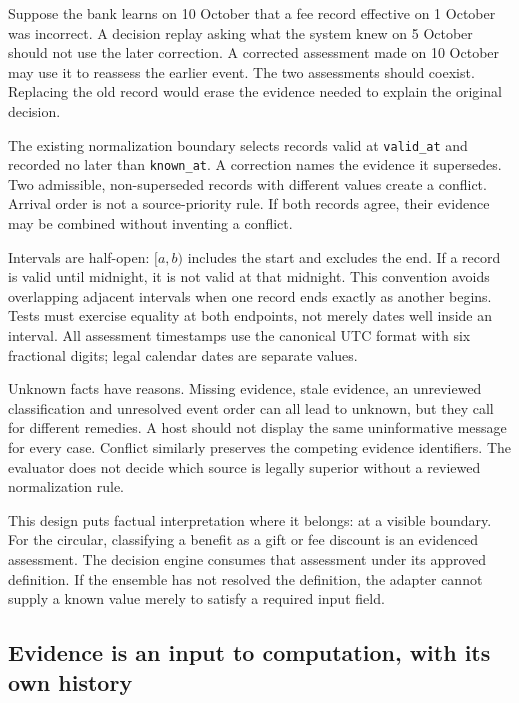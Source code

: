 Suppose the bank learns on 10 October that a fee record effective on 1 October
was incorrect. A decision replay asking what the system knew on 5 October should
not use the later correction. A corrected assessment made on 10 October may use
it to reassess the earlier event. The two assessments should coexist. Replacing
the old record would erase the evidence needed to explain the original decision.

The existing normalization boundary selects records valid at \texttt{valid\_at}
and recorded no later than \texttt{known\_at}. A correction names the evidence it
supersedes. Two admissible, non-superseded records with different values create a
conflict. Arrival order is not a source-priority rule. If both records agree,
their evidence may be combined without inventing a conflict.


Intervals are half-open: $[a,b)$ includes the start and excludes the end. If a
record is valid until midnight, it is not valid at that midnight. This convention
avoids overlapping adjacent intervals when one record ends exactly as another
begins. Tests must exercise equality at both endpoints, not merely dates well
inside an interval. All assessment timestamps use the canonical UTC format with
six fractional digits; legal calendar dates are separate values.

Unknown facts have reasons. Missing evidence, stale evidence, an unreviewed
classification and unresolved event order can all lead to unknown, but they call
for different remedies. A host should not display the same uninformative message
for every case. Conflict similarly preserves the competing evidence identifiers.
The evaluator does not decide which source is legally superior without a
reviewed normalization rule.

This design puts factual interpretation where it belongs: at a visible boundary.
For the circular, classifying a benefit as a gift or fee discount is an evidenced
assessment. The decision engine consumes that assessment under its approved
definition. If the ensemble has not resolved the definition, the adapter cannot
supply a known value merely to satisfy a required input field.

\subsection{Evidence is an input to computation, with its own history}
\label{merge:P-03a-rule-contract:01}


